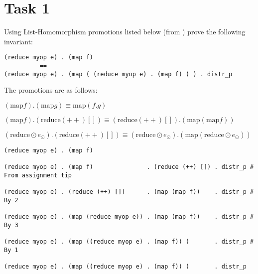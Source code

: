 \section{Task 1}
Using List-Homomorphism promotions listed below (from \cite[Slide 40]{l1intro})
prove the following invariant:
\begin{verbatim}
(reduce myop e) . (map f)
          ==
(reduce myop e) . (map ( (reduce myop e) . (map f) ) ) . distr_p
\end{verbatim}

\noindent The promotions are as follows:
\begin{enumerate*}
  \item $(\text{map} f) . (\text{map} g) \equiv \text{map}(f . g)$
  \item $(\text{map} f ) . (\text{reduce} (++) []) \equiv (\text{reduce} (++) []) . (\text{map} (\text{map} f ))$
  \item $(\text{reduce} \odot e_\odot) . (\text{reduce} (++) []) \equiv (\text{reduce} \odot e_\odot) . (\text{map} (\text{reduce} \odot e_\odot))$
\end{enumerate*}

\begin{verbatim}
(reduce myop e) . (map f)

(reduce myop e) . (map f)               . (reduce (++) []) . distr_p # From assignment tip

(reduce myop e) . (reduce (++) [])      . (map (map f))    . distr_p # By 2

(reduce myop e) . (map (reduce myop e)) . (map (map f))    . distr_p # By 3

(reduce myop e) . (map ((reduce myop e) . (map f)) )       . distr_p # By 1

(reduce myop e) . (map ((reduce myop e) . (map f)) )       . distr_p
\end{verbatim}
